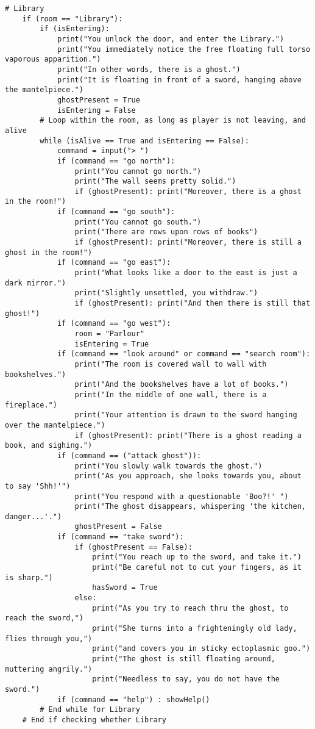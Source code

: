 \begin{lstlisting}[firstnumber=last]
    # Library
    if (room == "Library"):
        if (isEntering):
            print("You unlock the door, and enter the Library.")
            print("You immediately notice the free floating full torso vaporous apparition.")
            print("In other words, there is a ghost.")
            print("It is floating in front of a sword, hanging above the mantelpiece.")
            ghostPresent = True
            isEntering = False
        # Loop within the room, as long as player is not leaving, and alive
        while (isAlive == True and isEntering == False):
            command = input("> ")
            if (command == "go north"):
                print("You cannot go north.")
                print("The wall seems pretty solid.")
                if (ghostPresent): print("Moreover, there is a ghost in the room!")
            if (command == "go south"):
                print("You cannot go south.")
                print("There are rows upon rows of books")
                if (ghostPresent): print("Moreover, there is still a ghost in the room!")
            if (command == "go east"):
                print("What looks like a door to the east is just a dark mirror.")
                print("Slightly unsettled, you withdraw.")
                if (ghostPresent): print("And then there is still that ghost!")
            if (command == "go west"):
                room = "Parlour"
                isEntering = True
            if (command == "look around" or command == "search room"):
                print("The room is covered wall to wall with bookshelves.")
                print("And the bookshelves have a lot of books.")
                print("In the middle of one wall, there is a fireplace.")
                print("Your attention is drawn to the sword hanging over the mantelpiece.")
                if (ghostPresent): print("There is a ghost reading a book, and sighing.")
            if (command == ("attack ghost")):
                print("You slowly walk towards the ghost.")
                print("As you approach, she looks towards you, about to say 'Shh!'")
                print("You respond with a questionable 'Boo?!' ")
                print("The ghost disappears, whispering 'the kitchen, danger...'.")
                ghostPresent = False
            if (command == "take sword"):
                if (ghostPresent == False):
                    print("You reach up to the sword, and take it.")
                    print("Be careful not to cut your fingers, as it is sharp.")
                    hasSword = True
                else:
                    print("As you try to reach thru the ghost, to reach the sword,")
                    print("She turns into a frighteningly old lady, flies through you,")
                    print("and covers you in sticky ectoplasmic goo.")
                    print("The ghost is still floating around, muttering angrily.")
                    print("Needless to say, you do not have the sword.")
            if (command == "help") : showHelp()
        # End while for Library
    # End if checking whether Library
\end{lstlisting} 


